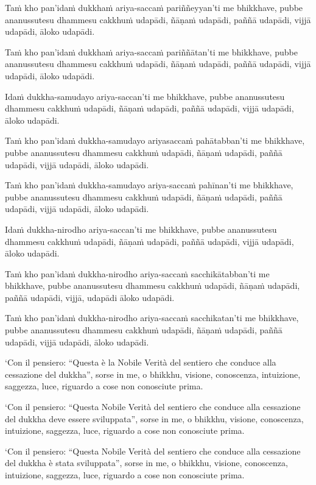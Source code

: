 \clearpage

\paliText
\markboth{\paliTitle}{\rightmark}

Taṁ kho pan'idaṁ dukkhaṁ ariya-saccaṁ pariññeyyan'ti me bhikkhave, pubbe
ananussutesu dhammesu cakkhuṁ udapādi, ñāṇaṁ udapādi, paññā udapādi,
vijjā udapādi, āloko udapādi.

Taṁ kho pan'idaṁ dukkhaṁ ariya-saccaṁ pariññātan'ti me bhikkhave, pubbe
ananussutesu dhammesu cakkhuṁ udapādi, ñāṇaṁ udapādi, paññā udapādi,
vijjā udapādi, āloko udapādi.

Idaṁ dukkha-samudayo ariya-saccan'ti me bhikkhave, pubbe ananussutesu
dhammesu cakkhuṁ udapādi, ñāṇaṁ udapādi, paññā udapādi, vijjā udapādi,
āloko udapādi.

Taṁ kho pan'idaṁ dukkha-samudayo ariyasaccaṁ pahātabban'ti me bhikkhave,
pubbe ananussutesu dhammesu cakkhuṁ udapādi, ñāṇaṁ udapādi, paññā
udapādi, vijjā udapādi, āloko udapādi.

Taṁ kho pan'idaṁ dukkha-samudayo ariya-saccaṁ pahīnan'ti me bhikkhave, pubbe
ananussutesu dhammesu cakkhuṁ udapādi, ñāṇaṁ udapādi, paññā udapādi,
vijjā udapādi, āloko udapādi.

Idaṁ dukkha-nirodho ariya-saccan'ti me bhikkhave, pubbe ananussutesu
dhammesu cakkhuṁ udapādi, ñāṇaṁ udapādi, paññā udapādi, vijjā udapādi,
āloko udapādi.

Taṁ kho pan'idaṁ dukkha-nirodho ariya-saccaṁ sacchikātabban'ti me bhikkhave,
pubbe ananussutesu dhammesu cakkhuṁ udapādi, ñāṇaṁ udapādi, paññā
udapādi, vijjā, udapādi āloko udapādi.

Taṁ kho pan'idaṁ dukkha-nirodho ariya-saccaṁ sacchikatan'ti me bhikkhave,
pubbe ananussutesu dhammesu cakkhuṁ udapādi, ñāṇaṁ udapādi, paññā
udapādi, vijjā udapādi, āloko udapādi.

\clearpage

\englishText
\markboth{\englishTitle}{\rightmark}

‘Con il pensiero: “Questa è la Nobile Verità del sentiero che conduce alla
cessazione del dukkha”, sorse in me, o bhikkhu, visione, conoscenza,
intuizione, saggezza, luce, riguardo a cose non conosciute prima.

‘Con il pensiero: “Questa Nobile Verità del sentiero che conduce alla cessazione
del dukkha deve essere sviluppata”, sorse in me, o bhikkhu, visione,
conoscenza, intuizione, saggezza, luce, riguardo a cose non conosciute prima.

‘Con il pensiero: “Questa Nobile Verità del sentiero che conduce alla cessazione
del dukkha è stata sviluppata”, sorse in me, o bhikkhu, visione,
conoscenza, intuizione, saggezza, luce, riguardo a cose non conosciute prima.

